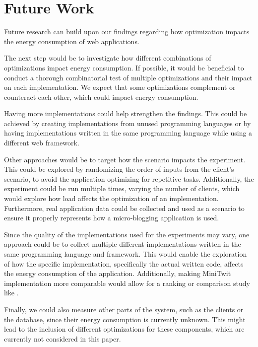 \documentclass[main.tex]{subfiles}
\begin{document}
\section{Future Work}
Future research can build upon our findings regarding how optimization impacts the energy consumption of web applications.

The next step would be to investigate how different combinations of optimizations impact energy consumption. If possible, it would be beneficial to conduct a thorough combinatorial test of multiple optimizations and their impact on each implementation. We expect that some optimizations complement or counteract each other, which could impact energy consumption.

Having more implementations could help strengthen the findings. This could be achieved by creating implementations from unused programming languages or by having implementations written in the same programming language while using a different web framework.

Other approaches would be to target how the scenario impacts the experiment. This could be explored by randomizing the order of inputs from the client's scenario, to avoid the application optimizing for repetitive tasks. Additionally, the experiment could be run multiple times, varying the number of clients, which would explore how load affects the optimization of an implementation. Furthermore, real application data could be collected and used as a scenario to ensure it properly represents how a micro-blogging application is used.

Since the quality of the implementations used for the experiments may vary, one approach could be to collect multiple different implementations written in the same programming language and framework. This would enable the exploration of how the specific implementation, specifically the actual written code, affects the energy consumption of the application. Additionally, making MiniTwit implementation more comparable would allow for a ranking or comparison study like \textcite{pereira2017energy, Pereira_Couto_Ribeiro_Rua_Cunha_Fernandes_Saraiva_2021, Couto_Pereira_Ribeiro_Rua_Saraiva_2017, Gordillo_Calero_Moraga_García_Fernandes_Abreu_Saraiva_2024}.

Finally, we could also measure other parts of the system, such as the clients or the database, since their energy consumption is currently unknown. This might lead to the inclusion of different optimizations for these components, which are currently not considered in this paper.
\end{document}
